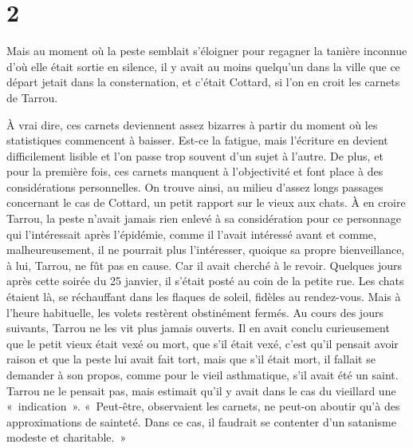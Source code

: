 \documentclass[french,twoside]{book} %
\begin{document}
\section[{2}]{2}
\noindent Mais au moment où la peste semblait s’éloigner pour regagner la tanière inconnue d’où elle était sortie en silence, il y avait au moins quelqu’un dans la ville que ce départ jetait dans la consternation, et c’était Cottard, si l’on en croit les carnets de Tarrou.\par
À vrai dire, ces carnets deviennent assez bizarres à partir du moment où les statistiques commencent à baisser. Est-ce la fatigue, mais l’écriture en devient difficilement lisible et l’on passe trop souvent d’un sujet à l’autre. De plus, et pour la première fois, ces carnets manquent à l’objectivité et font place à des considérations personnelles. On trouve ainsi, au milieu d’assez longs passages concernant le cas de Cottard, un petit rapport sur le vieux aux chats. À en croire Tarrou, la peste n’avait jamais rien enlevé à sa considération pour ce personnage qui l’intéressait après l’épidémie, comme il l’avait intéressé avant et comme, malheureusement, il ne pourrait plus l’intéresser, quoique sa propre bienveillance, à lui, Tarrou, ne fût pas en cause. Car il avait cherché à le revoir. Quelques jours après cette soirée du 25 janvier, il s’était posté au coin de la petite rue. Les chats étaient là, se réchauffant dans les flaques de soleil, fidèles au rendez-vous. Mais à l’heure habituelle, les volets restèrent obstinément fermés. Au cours des jours suivants, Tarrou ne les vit plus jamais ouverts. Il en avait conclu curieusement que le petit vieux était vexé ou mort, que s’il était vexé, c’est qu’il pensait avoir raison et que la peste lui avait fait tort, mais que s’il était mort, il fallait se demander à son propos, comme pour le vieil asthmatique, s’il avait été un saint. Tarrou ne le pensait pas, mais estimait qu’il y avait dans le cas du vieillard une « indication ». « Peut-être, observaient les carnets, ne peut-on aboutir qu’à des approximations de sainteté. Dans ce cas, il faudrait se contenter d’un satanisme modeste et charitable. »\par
\end{document}
